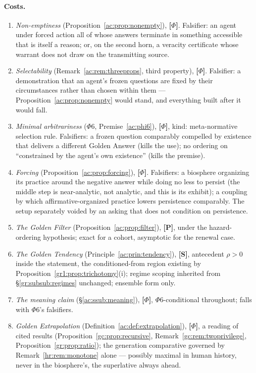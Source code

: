 \documentclass[11pt]{article}
\numberwithin{equation}{section}
\theoremstyle{plain}
\theoremstyle{definition}
\theoremstyle{remark}
\begin{document}
\paragraph{Costs.}
\begin{enumerate}
    \item \emph{Non-emptiness} (Proposition~\ref{ac:prop:nonempty}), \textbf{[$\Phi$]}. Falsifier: an agent under forced action all of whose answers terminate in something accessible that is itself a reason; or, on the second horn, a veracity certificate whose warrant does not draw on the transmitting source.
    \item \emph{Selectability} (Remark~\ref{ac:rem:threeprops}, third property), \textbf{[$\Phi$]}. Falsifier: a demonstration that an agent's frozen questions are fixed by their circumstances rather than chosen within them --- Proposition~\ref{ac:prop:nonempty} would stand, and everything built after it would fall.
    \item \emph{Minimal arbitrariness} ($\Phi6$, Premise~\ref{ac:phi6}), \textbf{[$\Phi$]}, kind: meta-normative selection rule. Falsifiers: a frozen question comparably compelled by existence that delivers a different Golden Answer (kills the use); no ordering on ``constrained by the agent's own existence'' (kills the premise).
    \item \emph{Forcing} (Proposition~\ref{ac:prop:forcing}), \textbf{[$\Phi$]}. Falsifiers: a biosphere organizing its practice around the negative answer while doing no less to persist (the middle step is near-analytic, not analytic, and this is its exhibit); a coupling by which affirmative-organized practice lowers persistence comparably. The setup separately voided by an asking that does not condition on persistence.
    \item \emph{The Golden Filter} (Proposition~\ref{ac:prop:filter}), \textbf{[P]}, under the hazard-ordering hypothesis; exact for a cohort, asymptotic for the renewal case.
    \item \emph{The Golden Tendency} (Principle~\ref{ac:prin:tendency}), \textbf{[S]}, antecedent $\rho > 0$ inside the statement, the conditioned-from region existing by Proposition~\ref{gr1:prop:trichotomy}(i); regime scoping inherited from \S\ref{gr:subsub:regimes} unchanged; ensemble form only.
    \item \emph{The meaning claim} (\S\ref{ac:ssub:meaning}), \textbf{[$\Phi$]}, $\Phi6$-conditional throughout; falls with $\Phi6$'s falsifiers.
    \item \emph{Golden Extrapolation} (Definition~\ref{ac:def:extrapolation}), \textbf{[$\Phi$]}, a reading of cited results (Proposition~\ref{gc:prop:recursive}, Remark~\ref{gc:rem:twoprivilege}, Proposition~\ref{gr:prop:ratio}); the generation comparative governed by Remark~\ref{hr:rem:monotone} alone --- possibly maximal in human history, never in the biosphere's, the superlative always ahead.

\end{enumerate}
\end{document}
